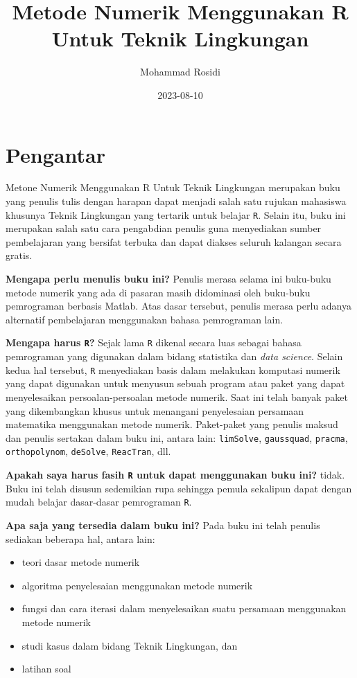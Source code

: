 \documentclass[
]{book}
\title{Metode Numerik Menggunakan R Untuk Teknik Lingkungan}
\author{Mohammad Rosidi}
\date{2023-08-10}
\providecommand{\tightlist}{%
  \setlength{\itemsep}{0pt}\setlength{\parskip}{0pt}}
\theoremstyle{definition}
\theoremstyle{definition}
\theoremstyle{definition}
\theoremstyle{definition}
\theoremstyle{remark}
\begin{document}
\maketitle

{
\setcounter{tocdepth}{1}
\tableofcontents
}
\hypertarget{pengantar}{%
\chapter*{Pengantar}\label{pengantar}}

Metone Numerik Menggunakan R Untuk Teknik Lingkungan merupakan buku yang penulis tulis dengan harapan dapat menjadi salah satu rujukan mahasiswa khusunya Teknik Lingkungan yang tertarik untuk belajar \texttt{R}. Selain itu, buku ini merupakan salah satu cara pengabdian penulis guna menyediakan sumber pembelajaran yang bersifat terbuka dan dapat diakses seluruh kalangan secara gratis.

\textbf{Mengapa perlu menulis buku ini?} Penulis merasa selama ini buku-buku metode numerik yang ada di pasaran masih didominasi oleh buku-buku pemrograman berbasis Matlab. Atas dasar tersebut, penulis merasa perlu adanya alternatif pembelajaran menggunakan bahasa pemrograman lain.

\textbf{Mengapa harus \texttt{R}?} Sejak lama \texttt{R} dikenal secara luas sebagai bahasa pemrograman yang digunakan dalam bidang statistika dan \emph{data science}. Selain kedua hal tersebut, \texttt{R} menyediakan basis dalam melakukan komputasi numerik yang dapat digunakan untuk menyusun sebuah program atau paket yang dapat menyelesaikan persoalan-persoalan metode numerik. Saat ini telah banyak paket yang dikembangkan khusus untuk menangani penyelesaian persamaan matematika menggunakan metode numerik. Paket-paket yang penulis maksud dan penulis sertakan dalam buku ini, antara lain: \texttt{limSolve}, \texttt{gaussquad}, \texttt{pracma}, \texttt{orthopolynom}, \texttt{deSolve}, \texttt{ReacTran}, dll.

\textbf{Apakah saya harus fasih \texttt{R} untuk dapat menggunakan buku ini?} tidak. Buku ini telah disusun sedemikian rupa sehingga pemula sekalipun dapat dengan mudah belajar dasar-dasar pemrograman \texttt{R}.

\textbf{Apa saja yang tersedia dalam buku ini?} Pada buku ini telah penulis sediakan beberapa hal, antara lain:

\begin{itemize}
\tightlist
\item
  teori dasar metode numerik
\item
  algoritma penyelesaian menggunakan metode numerik
\item
  fungsi dan cara iterasi dalam menyelesaikan suatu persamaan menggunakan metode numerik
\item
  studi kasus dalam bidang Teknik Lingkungan, dan
\item
  latihan soal
\end{itemize}
\end{document}

